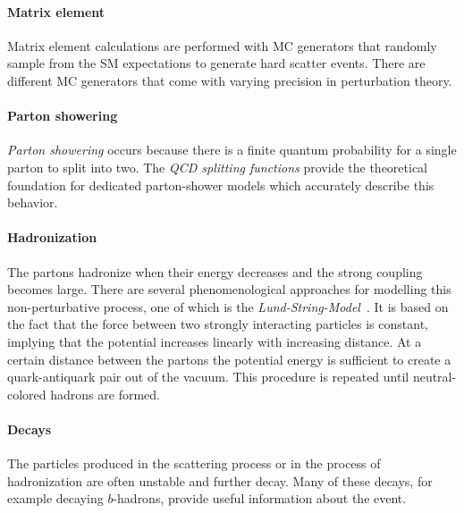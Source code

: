 
\paragraph{Matrix element}
Matrix element calculations are performed with MC generators that randomly sample from the SM expectations to generate hard scatter events. 
There are different MC generators that come with varying precision in perturbation theory. 

\paragraph{Parton showering}
\emph{Parton showering} occurs because there is a finite quantum probability for a single parton to split into two. The \emph{QCD splitting functions} \cite{Altarelli:1977zs} provide the theoretical foundation for dedicated parton-shower models which accurately describe this behavior.
\paragraph{Hadronization}
The partons hadronize when their energy decreases and the strong coupling becomes large. There are several phenomenological approaches for modelling this non-perturbative process, one of which is the \emph{Lund-String-Model}~\cite{Andersson:1983ia}. 
It is based on the fact that the force between two strongly interacting particles is constant, implying that the potential increases linearly with increasing distance.
At a certain distance between the partons the potential energy is sufficient to create a quark-antiquark pair out of the vacuum. This procedure is repeated until neutral-colored hadrons are formed.
\paragraph{Decays}
The particles produced in the scattering process or in the process of hadronization are often unstable and further decay. Many of these decays, for example decaying $b$-hadrons, provide useful information about the event. %
